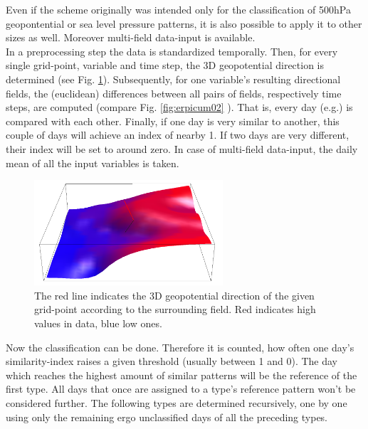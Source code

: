 \documentclass[12pt, oneside, a4paper, headsepline, plainheadsepline]{scrbook}
\begin{document}
Even if the scheme originally was intended only for the classification of 500hPa geopontential or sea level pressure patterns, it is also possible to apply it to other sizes as well. Moreover multi-field data-input is available.\\
In a preprocessing step the data is standardized temporally. Then, for every single grid-point, variable and time step, the 3D geopotential direction is determined (see Fig. \ref{fig:erpicum01}). Subsequently, for one variable's resulting directional fields, the (euclidean) differences between all pairs of fields, respectively time steps, are computed (compare Fig. \ref{fig:erpicum02} ). That is, every day (e.g.) is compared with each other. Finally, if one day is very similar to another, this couple of days will achieve an index of nearby 1. If two days are very different, their index will be set to around zero. In case of multi-field data-input, the daily mean of all the input variables is taken.\\
%
\begin{figure}[h]
\centering
\includegraphics[width=7cm]{erp_ug_3D.png}
\caption{The red line indicates the 3D geopotential direction of the given grid-point according to the surrounding field. Red indicates high values in data, blue low ones.}
\label{fig:erpicum01}
\end{figure}
%
Now the classification can be done. Therefore it is counted, how often one day's similarity-index raises a given threshold (usually between 1 and 0). The day which reaches the highest amount of similar patterns will be the reference of the first type. All days that once are assigned to a type's reference pattern won't be considered further. The following types are determined recursively, one by one using only the remaining ergo unclassified days of all the preceding types.\\
\end{document}
